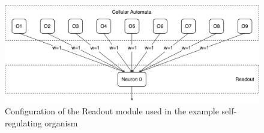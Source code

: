 \begin{figure}[ht]
  \centering
  \includegraphics[width=\linewidth]{fig/example-readout}
  \caption{
    Configuration of the Readout module used in the example
    self-regulating organism
  }
  \label{fig:example-setup-readout}
\end{figure}


